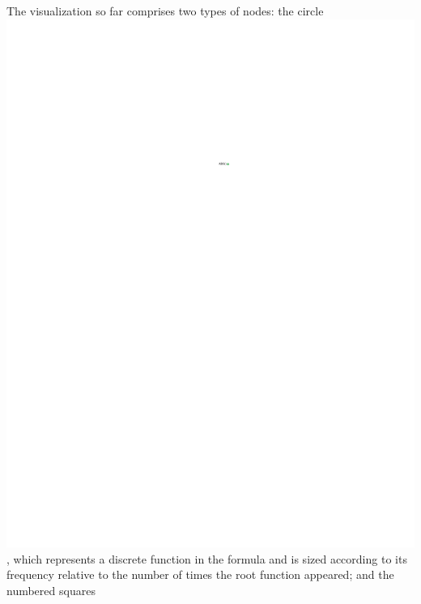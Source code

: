 \documentclass[conference]{IEEEtran}
\begin{document}
	The visualization so far comprises two types of nodes: the circle
	\includegraphics{glossary-greenonly}, which represents a discrete function in
	the formula and is sized according to its frequency relative to the number of
	times the root function appeared; and the numbered squares
\end{document}

